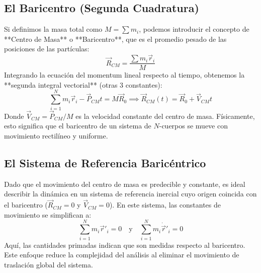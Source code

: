 \documentclass[a4paper]{article}
\begin{document}
\subsection{El Baricentro (Segunda Cuadratura)}
Si definimos la masa total como $M = \sum m_i$, podemos introducir el concepto de **Centro de Masa** o **Baricentro**, que es el promedio pesado de las posiciones de las partículas:
\begin{equation}
    \vec{R}_{CM} = \frac{\sum m_i \vec{r}_i}{M}
\end{equation}
Integrando la ecuación del momentum lineal respecto al tiempo, obtenemos la **segunda integral vectorial** (otras 3 constantes):
\begin{equation}
    \sum_{i=1}^N m_i \vec{r}_i - \vec{P}_{CM}t = M\vec{R}_0 \implies \vec{R}_{CM}(t) = \vec{R}_0 + \vec{V}_{CM}t
\end{equation}
Donde $\vec{V}_{CM} = \vec{P}_{CM}/M$ es la velocidad constante del centro de masa. Físicamente, esto significa que el baricentro de un sistema de $N$-cuerpos se mueve con movimiento rectilíneo y uniforme.

\subsection{El Sistema de Referencia Baricéntrico}
Dado que el movimiento del centro de masa es predecible y constante, es ideal describir la dinámica en un sistema de referencia inercial cuyo origen coincida con el baricentro ($\vec{R}_{CM} = 0$ y $\vec{V}_{CM} = 0$). En este sistema, las constantes de movimiento se simplifican a:
\begin{equation}
    \sum_{i=1}^N m_i \vec{r}'_i = 0 \quad \text{y} \quad \sum_{i=1}^N m_i \dot{\vec{r}}'_i = 0
\end{equation}
Aquí, las cantidades primadas indican que son medidas respecto al baricentro. Este enfoque reduce la complejidad del análisis al eliminar el movimiento de traslación global del sistema.



 
\end{document}
